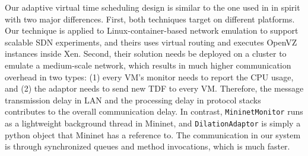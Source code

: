 

Our adaptive virtual time scheduling design is similar to the one used in \cite{NtwkEmultAdaptVirtTime} in spirit with two major differences. 
First, both techniques target on different platforms. 
Our technique is applied to Linux-container-based network emulation to support scalable SDN experiments, and theirs uses virtual routing and executes OpenVZ instances inside Xen. 
Second, their solution needs be deployed on a cluster to emulate a medium-scale network, which results in much higher communication overhead in two types: (1) every VM's monitor needs to report the CPU usage, and (2) the adaptor needs to send new TDF to every VM. 
Therefore, the message transmission delay in LAN and the processing delay in protocol stacks contributes to the overall communication delay. 
In contrast, \texttt{MininetMonitor} runs as a lightweight background thread in Mininet, and \texttt{DilationAdaptor} is simply a python object that Mininet has a reference to. 
The communication in our system is through synchronized queues and method invocations, which is much faster. 

